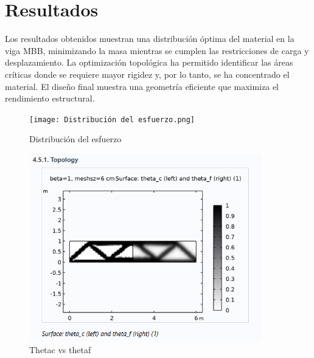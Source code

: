 \documentclass{article}
\theoremstyle{mytheoremstyle}
\theoremstyle{mytheoremstyle}
\theoremstyle{myproblemstyle}
\begin{document}
\section{Resultados}
Los resultados obtenidos muestran una distribución óptima del material en la viga MBB, minimizando la masa mientras se cumplen las restricciones de carga y desplazamiento. La optimización topológica ha permitido identificar las áreas críticas donde se requiere mayor rigidez y, por lo tanto, se ha concentrado el material. El diseño final muestra una geometría eficiente que maximiza el rendimiento estructural.
 \begin{figure}[H]
              \centering
              \texttt{[image: Distribución del esfuerzo.png]}
              \caption{Distribución del esfuerzo}
              \label{fig:imagen_x}
            \end{figure}
             \begin{figure}[H]
              \centering
              \includegraphics[width=0.9\textwidth]{Thetac.png}
              \caption{Thetac vs thetaf} 
              \label{fig:imagen_x}
            \end{figure}
\end{document}

